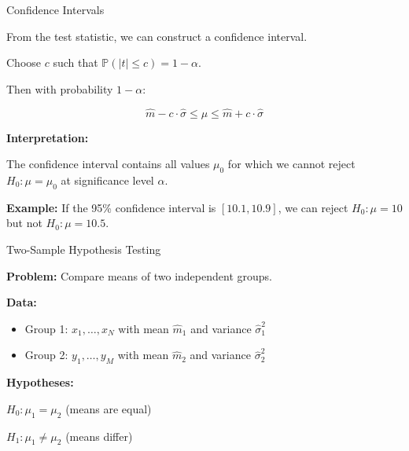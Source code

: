 \documentclass{beamer}
\begin{document}
\begin{frame}{Confidence Intervals}

From the test statistic, we can construct a confidence interval.

\vspace{0.3cm}

Choose $c$ such that $\mathbb{P}(|t| \le c) = 1 - \alpha$.

\vspace{0.3cm}

Then with probability $1-\alpha$:

\[
\hat{m} - c \cdot \hat{\sigma} \le \mu \le \hat{m} + c \cdot \hat{\sigma}
\]

\vspace{0.3cm}

\textbf{Interpretation:}

The confidence interval contains all values $\mu_0$ for which we cannot reject $H_0: \mu = \mu_0$ at significance level $\alpha$.

\vspace{0.3cm}

\textbf{Example:} If the 95\% confidence interval is $[10.1, 10.9]$, we can reject $H_0: \mu = 10$ but not $H_0: \mu = 10.5$.

\end{frame}

\begin{frame}{Two-Sample Hypothesis Testing}

\textbf{Problem:} Compare means of two independent groups.

\vspace{0.3cm}

\textbf{Data:}
\begin{itemize}
    \item Group 1: $x_1, \ldots, x_N$ with mean $\hat{m}_1$ and variance $\hat{\sigma}_1^2$
    \item Group 2: $y_1, \ldots, y_M$ with mean $\hat{m}_2$ and variance $\hat{\sigma}_2^2$
\end{itemize}

\vspace{0.3cm}

\textbf{Hypotheses:}

$H_0: \mu_1 = \mu_2$ (means are equal)

$H_1: \mu_1 \ne \mu_2$ (means differ)

\end{frame}
\end{document}
